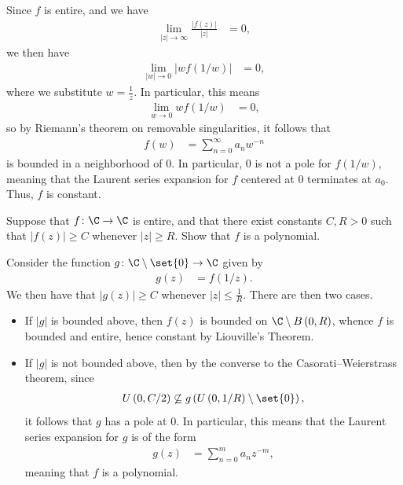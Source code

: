 \documentclass[10pt]{mypackage}
\begin{document}
\begin{solution}
  Since $f$ is entire, and we have
  \begin{align*}
    \lim_{|z|\rightarrow\infty} \frac{\left\vert f(z) \right\vert}{\left\vert z \right\vert} &= 0,
  \end{align*}
  we then have
  \begin{align*}
    \lim_{|w|\rightarrow 0} \left\vert wf\left( 1/w \right) \right\vert &= 0,
  \end{align*}
  where we substitute $w = \frac{1}{z}$. In particular, this means
  \begin{align*}
    \lim_{w\rightarrow 0} wf\left( 1/w \right) &= 0,
  \end{align*}
  so by Riemann's theorem on removable singularities, it follows that
  \begin{align*}
    f(w) &= \sum_{n=0}^{\infty}a_nw^{-n}
  \end{align*}
  is bounded in a neighborhood of $0$. In particular, $0$ is not a pole for $f\left( 1/w \right)$, meaning that the Laurent series expansion for $f$ centered at $0$ terminates at $a_0$. Thus, $f$ is constant.
\end{solution}
\begin{problem}[Problem 3]
  Suppose that $f\colon \C\rightarrow \C$ is entire, and that there exist constants $C,R > 0$ such that $\left\vert f(z) \right\vert \geq C$ whenever $\left\vert z \right\vert \geq R$. Show that $f$ is a polynomial.
\end{problem}
\begin{solution}
  Consider the function $g\colon \C\setminus \set{0}\rightarrow \C$ given by
  \begin{align*}
    g(z) &= f\left( 1/z \right).
  \end{align*}
  We then have that $\left\vert g(z) \right\vert\geq C$ whenever $\left\vert z \right\vert \leq \frac{1}{R}$. There are then two cases.
  \begin{itemize}
    \item If $\left\vert g \right\vert$ is bounded above, then $f\left( z \right)$ is bounded on $\C\setminus B\left( 0,R \right)$, whence $f$ is bounded and entire, hence constant by Liouville's Theorem.
    \item If $\left\vert g \right\vert$ is not bounded above, then by the converse to the Casorati--Weierstrass theorem, since
      \begin{align*}
        U\left( 0,C/2 \right) \not\subseteq g\left( U\left( 0,1/R \right)\setminus \set{0} \right),
      \end{align*}
      it follows that $g$ has a pole at $0$. In particular, this means that the Laurent series expansion for $g$ is of the form
      \begin{align*}
        g(z) &= \sum_{n=0}^{m} a_nz^{-m},
      \end{align*}
      meaning that $f$ is a polynomial.
  \end{itemize}
\end{solution}
\end{document}
